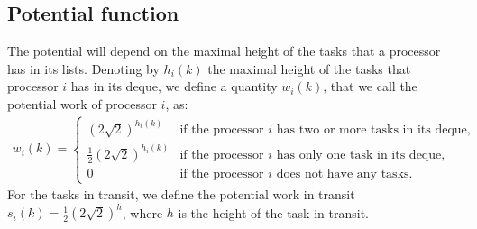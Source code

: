\subsection{Potential function}
The potential will depend on the maximal height of
the tasks that a processor has in its lists. Denoting by $h_i(k)$ the
maximal height of the tasks that processor $i$ has in its deque, we
define a quantity $w_i(k)$, that we call the potential work of
processor $i$, as:
\begin{align*}
  w_i(k)=\left\{
  \begin{array}{ll}
    (2\sqrt{2})^{h_i(k)} & \text{if the processor
                           $i$ has two or more tasks in its deque,}\\
    \frac12(2\sqrt{2})^{h_i(k)}& \text{if the processor
                                 $i$ has only one task in its deque,}\\
    0 & \text{if the processor
        $i$ does not have any tasks.}
  \end{array}
        \right.
\end{align*}
For the tasks in transit, we define the potential work in transit
$s_i(k)=\frac12(2\sqrt{2})^{h}$, where $h$ is the height of the task
in transit.


